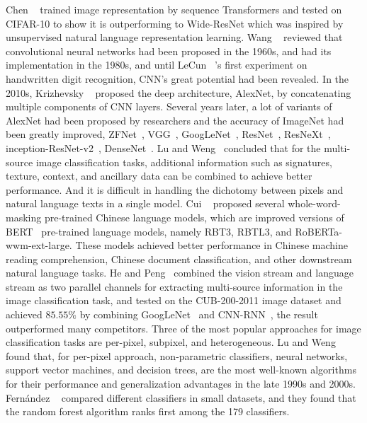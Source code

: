 \documentclass[10pt,twocolumn,letterpaper]{article}
\begin{document}
  Chen \etal~\cite{chen2020generative} trained image representation by sequence Transformers and tested on CIFAR-10 to show it is outperforming to Wide-ResNet
which was inspired by unsupervised natural language representation learning.
  Wang \etal~\cite{wang2019development} reviewed that convolutional neural networks had been proposed in the 1960s, and had its implementation in the 1980s,
and until LeCun \etal~\cite{lecun1990handwritten}'s first experiment on handwritten digit recognition, CNN's great potential had been revealed.
  In the 2010s, Krizhevsky \etal~\cite{krizhevsky2012imagenet} proposed the deep architecture, AlexNet, by concatenating multiple components of CNN layers.
Several years later, a lot of variants of AlexNet had been proposed by researchers and the accuracy of ImageNet had been greatly improved, \eg ZFNet~\cite{zeiler2014visualizing}, VGG~\cite{simonyan2014very}, GoogLeNet~\cite{szegedy2015going}, ResNet~\cite{he2016deep},
 ResNeXt~\cite{xie2017aggregated}, inception-ResNet-v2~\cite{szegedy2016inception}, DenseNet~\cite{huang2016deep}.
  Lu and Weng~\cite{lu2007survey} concluded that for the multi-source image classification tasks, additional information such as signatures, texture, context, and ancillary data can be combined to achieve better performance.
And it is difficult in handling the dichotomy between pixels and natural language texts in a single model.
  Cui \etal~\cite{cui2020revisiting} proposed several whole-word-masking pre-trained Chinese language models,
which are improved versions of BERT~\cite{devlin2019bert} pre-trained language models, namely RBT3, RBTL3, and RoBERTa-wwm-ext-large.
These models achieved better performance in Chinese machine reading comprehension, Chinese document classification, and other downstream natural language tasks.
  He and Peng~\cite{he2017fine} combined the vision stream and language stream as two parallel channels for extracting multi-source information in the image classification task,
and tested on the CUB-200-2011 image dataset and achieved $85.55\%$ by combining GoogLeNet~\cite{szegedy2015going} and CNN-RNN~\cite{reed2016learning}, the result outperformed many competitors.
  Three of the most popular approaches for image classification tasks are per-pixel, subpixel, and heterogeneous.
Lu and Weng found that, for per-pixel approach, non-parametric classifiers, \eg neural networks, support vector machines, and decision trees,
are the most well-known algorithms for their performance and generalization advantages in the late 1990s and 2000s.
Fern{\'a}ndez \etal~\cite{fernandez2014we} compared different classifiers in small datasets, and they found that the random forest algorithm ranks first among the 179 classifiers.
\end{document}
